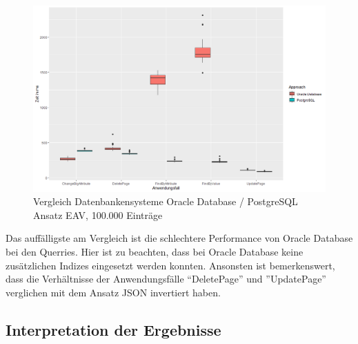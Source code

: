 \begin{figure}[H]
\centering
\includegraphics[scale=0.5]{rStudioPictures/oraclepostgreseav100k1100700.png}
\caption{Vergleich Datenbankensysteme Oracle Database / PostgreSQL \\ Ansatz EAV, 100.000 Einträge}
\label{fig:DatabasesEAV}
\end{figure}

Das auffälligste am Vergleich ist die schlechtere Performance von Oracle Database bei den Querries. Hier ist zu beachten, dass bei Oracle Database keine zusätzlichen Indizes eingesetzt werden konnten. Ansonsten ist bemerkenswert, dass die Verhältnisse der Anwendungsfälle ``DeletePage'' und ''UpdatePage'' verglichen mit dem Ansatz JSON invertiert haben.

\begin{table}[h]
\caption{P-Werte der Alternativhypothesen des Mann-Whitney-U-Tests für den Vergleich PostgreSQL und Oracle Database, Ansatz EAV}
\centering
{}
\label{tab:mwDatabasesEAV}
\end{table}

\subsection{Interpretation der Ergebnisse}

